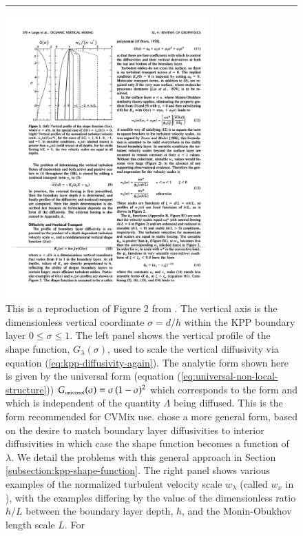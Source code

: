  
\begin{figure}[h!t]
\rule{\textwidth}{0.005in}
\begin{center}
\includegraphics[angle=0,width=8cm]{./figs/LargeKPP_fig2.pdf}
\caption[Figure 2 from \cite{LargeKPP}]{ \sf This is a reproduction of
  Figure 2 from \cite{LargeKPP}.  The vertical axis is the
  dimensionless vertical coordinate $\sigma = d/h$ within the KPP
  boundary layer $0 \le \sigma \le 1$.  The left panel shows the
  vertical profile of the shape function, $G_{\lambda}(\sigma)$, used
  to scale the vertical diffusivity via equation
  (\ref{eq:kpp-diffusivity-again}).  The analytic form shown here is
  given by the universal form (equation
  (\ref{eq:universal-non-local-structure})) $G_{\mbox{\tiny
      universal}}(\sigma) = \sigma \, (1-\sigma)^{2}$ which
  corresponds to the \cite{Troen_Mahrt1986} form and which is
  independent of the quantity $\Lambda$ being diffused.  This is the
  form recommended for CVMix use.  \cite{LargeKPP} chose a more
  general form, based on the desire to match boundary layer
  diffusivities to interior diffusivities in which case the shape
  function becomes a function of $\lambda$.  We detail the problems
  with this general approach in Section
  \ref{subsection:kpp-shape-function}.  The right panel shows various
  examples of the normalized turbulent velocity scale $w_{\lambda}$
  (called $w_{x}$ in \cite{LargeKPP}), with the examples differing by
  the value of the dimensionless ratio $h/L$ between the boundary
  layer depth, $h$, and the Monin-Obukhov length scale $L$.  For
}
\end{center}
\end{figure}
